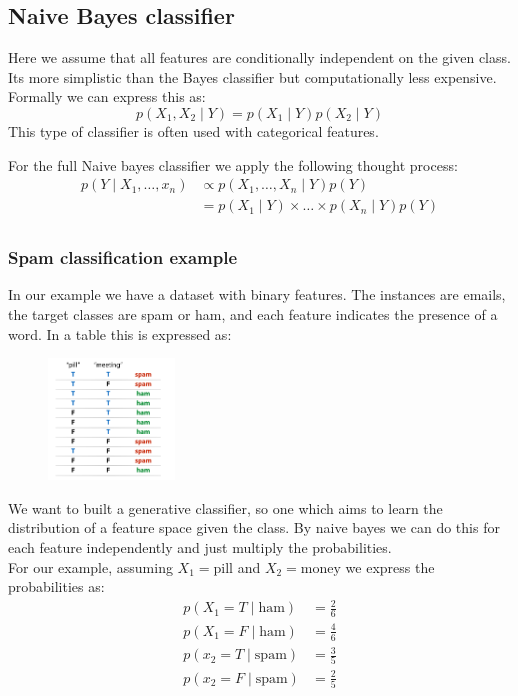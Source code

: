 \documentclass[12pt]{article}
\begin{document}
\subsection{Naive Bayes classifier}

Here we assume that all features are conditionally independent on the given class. Its more simplistic than the Bayes classifier but computationally less expensive. Formally we can express this as: 
\[
    p(X_1, X_2\mid Y) = p(X_1\mid Y)p(X_2\mid Y)  
\]
This type of classifier is often used with categorical features.

For the full Naive bayes classifier we apply the following thought process: 
\begin{align*}
    p(Y\mid X_1, \ldots, x_n) & \propto p(X_1, \ldots, X_n\mid Y)p(Y) \\
    & = p(X_1\mid Y)\times\ldots \times p(X_n\mid Y)p(Y) \\
\end{align*}

\newpage 
\subsubsection*{Spam classification example}
In our example we have a dataset with binary features. The instances are emails, the target classes are spam or ham, and each feature indicates the presence of a word. In a table this is expressed as: 
\begin{figure}[!h]
    \centering
    \includegraphics[width=0.3\textwidth]{assets/spamclassifier.png}
\end{figure}

We want to built a generative classifier, so one which aims to learn the distribution of a feature space given the class. By naive bayes we can do this for each feature independently and just multiply the probabilities.\\
For our example, assuming $X_1 = \text{pill}$ and $X_2 = \text{money}$ we express the probabilities as: 
\begin{align*}
    p(X_1 = T\mid \text{ham}) & = \frac{2}{6} \\
    p(X_1 = F\mid \text{ham}) & = \frac{4}{6} \\
    p(x_2 = T\mid \text{spam}) & = \frac{3}{5} \\
    p(x_2 = F\mid \text{spam}) & = \frac{2}{5} \\
\end{align*}
\end{document}

